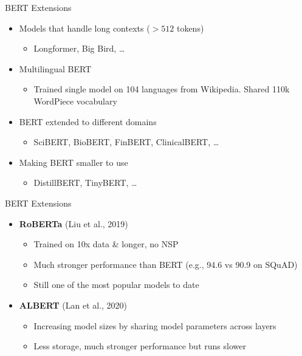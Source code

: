 \documentclass[serif, aspectratio=169]{beamer}
\begin{document}
\begin{frame}{BERT Extensions}
    \begin{itemize}
        \item Models that handle long contexts ($> 512$ tokens)
        \begin{itemize}
            \item Longformer, Big Bird, \dots
        \end{itemize}
        
        \item Multilingual BERT
        \begin{itemize}
            \item Trained single model on 104 languages from Wikipedia. Shared 110k WordPiece vocabulary
        \end{itemize}
        
        \item BERT extended to different domains
        \begin{itemize}
            \item SciBERT, BioBERT, FinBERT, ClinicalBERT, \dots
        \end{itemize}
        
        \item Making BERT smaller to use
        \begin{itemize}
            \item DistillBERT, TinyBERT, \dots
        \end{itemize}
    \end{itemize}
\end{frame}

\begin{frame}{BERT Extensions}
    \begin{itemize}
        \item \textbf{RoBERTa} {\color{green}(Liu et al., 2019)}
        \vspace{0.3cm}
        \begin{itemize}
            \item Trained on 10x data \& longer, no NSP
            \item Much stronger performance than BERT (e.g., 94.6 vs 90.9 on SQuAD)
            \item Still one of the most popular models to date
        \end{itemize}
        \vspace{0.5cm}
        \item \textbf{ALBERT} {\color{green}(Lan et al., 2020)}
        \vspace{0.3}
        \begin{itemize}
            \item Increasing model sizes by sharing model parameters across layers
            \item Less storage, much stronger performance but runs slower
        \end{itemize}
    \end{itemize}
\end{frame}
\end{document}
